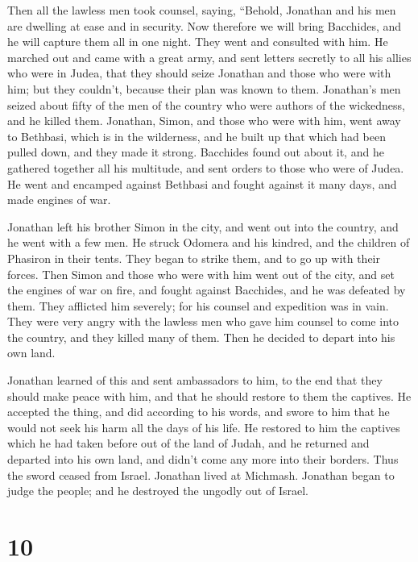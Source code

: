  Then all the lawless men took counsel, saying, ``Behold,
Jonathan and his men are dwelling at ease and in security. Now therefore
we will bring Bacchides, and he will capture them all in one night.
 They went and consulted with him.  He marched
out and came with a great army, and sent letters secretly to all his
allies who were in Judea, that they should seize Jonathan and those who
were with him; but they couldn't, because their plan was known to them.
 Jonathan's men seized about fifty of the men of the
country who were authors of the wickedness, and he killed them.
 Jonathan, Simon, and those who were with him, went away to
Bethbasi, which is in the wilderness, and he built up that which had
been pulled down, and they made it strong.  Bacchides found
out about it, and he gathered together all his multitude, and sent
orders to those who were of Judea.  He went and encamped
against Bethbasi and fought against it many days, and made engines of
war.

 Jonathan left his brother Simon in the city, and went out
into the country, and he went with a few men.  He struck
Odomera and his kindred, and the children of Phasiron in their tents.
 They began to strike them, and to go up with their forces.
Then Simon and those who were with him went out of the city, and set the
engines of war on fire,  and fought against Bacchides, and
he was defeated by them. They afflicted him severely; for his counsel
and expedition was in vain.  They were very angry with the
lawless men who gave him counsel to come into the country, and they
killed many of them. Then he decided to depart into his own land.

 Jonathan learned of this and sent ambassadors to him, to
the end that they should make peace with him, and that he should restore
to them the captives.  He accepted the thing, and did
according to his words, and swore to him that he would not seek his harm
all the days of his life.  He restored to him the captives
which he had taken before out of the land of Judah, and he returned and
departed into his own land, and didn't come any more into their borders.
 Thus the sword ceased from Israel. Jonathan lived at
Michmash. Jonathan began to judge the people; and he destroyed the
ungodly out of Israel.

\hypertarget{section-9}{%
\section{10}\label{section-9}}

